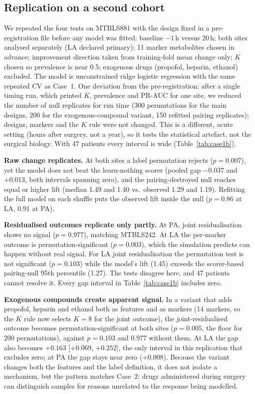 \documentclass[conference]{IEEEtran}
\newcommand{\verified}[1]{#1}  %
\begin{document}
\subsection{Replication on a second cohort}
We repeated the four tests on MTBLS881 with the design fixed in a
pre-registration file before any model was fitted: baseline $-1$\,h versus
20\,h; both sites analysed separately (LA declared primary); 11 marker
metabolites chosen in advance; improvement direction taken from training-fold
mean change only; $K$ chosen so prevalence is near 0.5; exogenous drugs
(propofol, heparin, ethanol) excluded. The model is unconstrained ridge
logistic regression with the same repeated CV as Case~1. One deviation from
the pre-registration: after a single timing run, which printed $K$,
prevalence and PR-AUC for one site, we reduced the number of null replicates
for run time (300 permutations for the main designs, 200 for the
exogenous-compound variant, 150 refitted pairing replicates); designs,
markers and the $K$ rule were not changed. This is a different, acute setting
(hours after surgery, not a year), so it tests the statistical artefact, not
the surgical biology. With 47 patients every interval is wide
(Table~\ref{tab:case1b}).

\textbf{Raw change replicates.} At both sites a label permutation rejects
($p=\verified{0.007}$), yet the model does not beat the learn-nothing scorer
(pooled gap \verified{$-0.037$} and \verified{$+0.013$}, both intervals
spanning zero), and the pairing-destroyed null reaches equal or higher lift
(median \verified{1.49} and \verified{1.40} vs.\ observed \verified{1.29} and
\verified{1.19}). Refitting the full model on each shuffle puts the observed
lift inside the null ($p=\verified{0.86}$ at LA, \verified{0.91} at PA).

\textbf{Residualised outcomes replicate only partly.} At PA, joint
residualisation shows no signal ($p=\verified{0.977}$), matching MTBLS242. At
LA the per-marker outcome is permutation-significant ($p=\verified{0.003}$),
which the simulation predicts can happen without real signal. For LA joint
residualisation the permutation test is not significant
($p=\verified{0.103}$) while the model's lift (\verified{1.45}) exceeds the
scorer-based pairing-null 95th percentile (\verified{1.27}). The tests
disagree here, and 47 patients cannot resolve it. Every gap interval in
Table~\ref{tab:case1b} includes zero.

\textbf{Exogenous compounds create apparent signal.} In a variant that adds
propofol, heparin and ethanol both as features and as markers (14 markers,
so the $K$ rule now selects $K=8$ for the joint outcome), the
joint-residualised outcome becomes permutation-significant at both sites
($p=\verified{0.005}$, the floor for 200 permutations), against
$p=\verified{0.103}$ and \verified{0.977} without them. At LA the gap also
becomes \verified{$+0.163$} [\verified{$+0.069$}, \verified{$+0.252$}], the
only interval in this replication that excludes zero; at PA the gap stays
near zero (\verified{$+0.008$}). Because the variant changes both the
features and the label definition, it does not isolate a mechanism, but the
pattern matches Case~2: drugs administered during surgery can distinguish
samples for reasons unrelated to the response being modelled.
\end{document}
